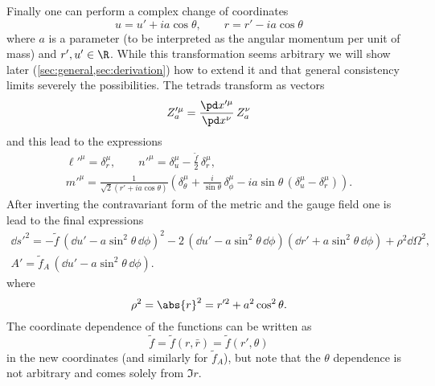 Finally one can perform a complex change of coordinates
\begin{equation}
	\label{algo:eq:change:complexification-ur}
	u = u' + i a \cos \theta, \qquad
	r = r' - i a \cos \theta
\end{equation} 
where $a$ is a parameter (to be interpreted as the angular momentum per unit of mass) and $r', u' \in \R$.
While this transformation seems arbitrary we will show later (\cref{sec:general,sec:derivation}) how to extend it and that general consistency limits severely the possibilities.
The tetrads transform as vectors
\begin{equation}
	Z'^\mu_a = \frac{\pd x'^\mu}{\pd x^\nu}\, Z^\nu_a
\end{equation} 
and this lead to the expressions
\begin{equation}
\begin{gathered}
	\label{algo:eq:rotating:tetrads}
	\ell'^\mu = \delta_r^\mu, \qquad
	n'^\mu = \delta_u^\mu - \frac{\tilde f}{2}\, \delta_r^\mu, \\
	m'^\mu = \frac{1}{\sqrt{2} (r' + i a \cos \theta)} \left(\delta_\theta^\mu + \frac{i}{\sin \theta}\, \delta_\phi^\mu - i a \sin \theta\, (\delta_u^\mu - \delta_r^\mu) \right).
\end{gathered}
\end{equation} 
After inverting the contravariant form of the metric and the gauge field one is lead to the final expressions
\begin{subequations}
\label{algo:eq:rotating:ur}
\begin{gather}
	\label{algo:metric:rotating:ur}
		\dd s'^2  = - \tilde f\, (\dd u' - a \sin^2 \theta\, \dd\phi)^2
			- 2\, (\dd u' - a \sin^2 \theta\, \dd\phi) (\dd r' + a \sin^2 \theta\, \dd\phi)
			+ \rho^2 \dd \Omega^2, \\
	A' = \tilde f_A\, (\dd u' - a \sin^2 \theta\, \dd \phi).
\end{gather}
\end{subequations}
where
\begin{equation}
	\label{algo:eq:rotating:metric:rho}
	\rho^2 = \abs{r}^2
		= r'^2 + a^2 \cos^2 \theta.
\end{equation} 
The coordinate dependence of the functions can be written as
\begin{equation}
	\tilde f = \tilde f(r, \bar r)
		= \tilde f(r', \theta)
\end{equation} 
in the new coordinates (and similarly for $\tilde f_A$), but note that the $\theta$ dependence is not arbitrary and comes solely from $\Im r$.



